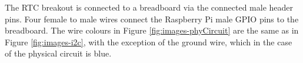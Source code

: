 The RTC breakout is connected to a breadboard via the connected male header
pins. Four female to male wires connect the Raspberry Pi male GPIO pins to the
breadboard. The wire colours in Figure \ref{fig:images-phyCircuit} are the same
as in Figure \ref{fig:images-i2c}, with the exception of the ground wire, which
in the case of the physical circuit is blue.
